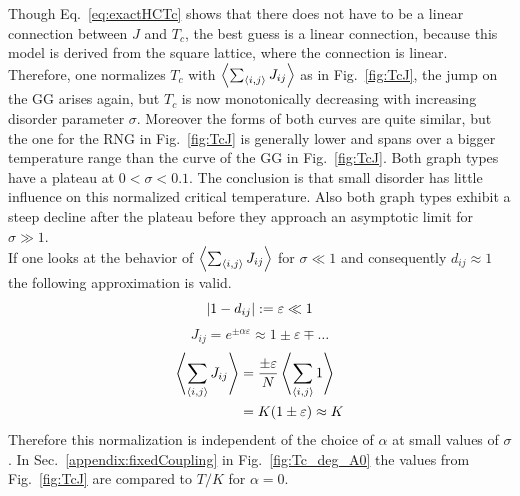         Though Eq.\ \eqref{eq:exactHCTc} shows that there does not have
        to be a linear connection between \(J\) and \(T_c\), the best guess
        is a linear connection, because this model is derived from the
        square lattice, where the connection is linear. Therefore, one
        normalizes \(T_c\) with \(\left< \sum_{\left< i,j \right>} J_{ij} \right>\) as in
        Fig.\ \ref{fig:TcJ}, the
        jump on the GG arises again, but \(T_c\) is now monotonically
        decreasing with increasing disorder parameter \(\sigma\).
        Moreover the forms of both curves are quite similar, but the
        one for the RNG in Fig.\ \ref{fig:TcJ}
        is generally lower and spans over a bigger temperature range than
        the curve of the GG in Fig.\ \ref{fig:TcJ}.
        Both graph types have a plateau at \(0 < \sigma < 0.1\). The conclusion
        is that small disorder has little influence on this normalized critical
        temperature.
        Also both graph types exhibit a steep decline after the plateau before
        they approach an asymptotic limit for \(\sigma \gg 1\).\\
        If one looks at the behavior of \(\left< \sum_{\left< i,j \right>} J_{ij} \right>\)
        for \(\sigma \ll 1\) and consequently \(d_{ij} \approx 1\) the
        following approximation is valid.
        \begin{equation}
            \left\vert1-d_{ij}\right\vert := \varepsilon \ll 1
        \end{equation}
        \begin{equation}
            J_{ij} = e^{\pm \alpha \varepsilon} \approx 1 \pm \varepsilon \mp \dots
        \end{equation}
        \begin{align}
            \left< \sum_{\left< i,j \right>} J_{ij} \right> &= \frac{\pm \varepsilon}{N} \left< \sum_{\left< i,j \right>} 1 \right> \\
                                          &= K(1 \pm \varepsilon) \approx K
        \end{align}
        Therefore this normalization is independent of the choice of \(\alpha\)
        at small values of \(\sigma\). In Sec.\ \ref{appendix:fixedCoupling}
        in Fig.\ \ref{fig:Tc_deg_A0}
        the values from Fig.\ \ref{fig:TcJ}
        are compared to \(T / K\) for \(\alpha = 0\).

